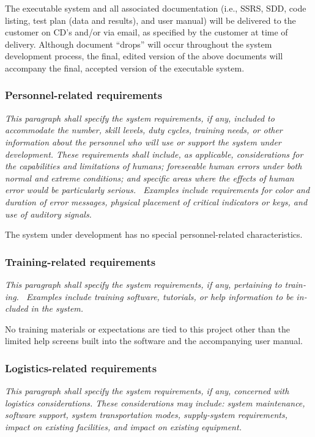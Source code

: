 \documentclass[twoside,letterpaper]{article}
\begin{document}
The executable system and all associated documentation (i.e., SSRS,
SDD, code listing, test plan (data and results), and user manual) will
be delivered to the customer on CD's and/or via email, as specified by
the customer at time of delivery. Although document ``drops'' will
occur throughout the system development process, the final, edited
version of the above documents will accompany the final, accepted
version of the executable system.

\subsubsection[Personnel{}-related requirements]{\rmfamily\bfseries
Personnel-related requirements}
\hypertarget{RefHeading19459017292}{}{
{\textit{This paragraph shall specify the system requirements,
if any, included to accommodate
the number, skill levels, duty cycles, training needs, or other information about the personnel who will use or support
the system under development. These requirements shall include, as applicable, considerations for the capabilities
and limitations of humans; foreseeable human errors under both normal and extreme conditions; and specific areas where
the effects of human error would be particularly serious. \ Examples include requirements for color and duration of
error messages, physical placement of critical indicators or keys, and use of auditory
signals.}}\foreignlanguage{english}{ }}

{\color{black}
The system under development has no special personnel-related characteristics. }

\subsubsection[Training{}-related requirements]{\rmfamily\bfseries\color{black} Training-related
requirements}
\hypertarget{RefHeading19659017292}{}{\color{black}
\foreignlanguage{english}{\textit{This paragraph shall specify the system requirements, if any, pertaining to training.
\ Examples include training software, tutorials, or help information to be included in the
system.}}\foreignlanguage{english}{ \ \ }}

{\color{black}
No training materials or expectations are tied to this project other than the limited help screens built into the
software and the accompanying user manual.}

\subsubsection[Logistics{}-related requirements]{\rmfamily\bfseries\color{black}
Logistics-related requirements}
\hypertarget{RefHeading19859017292}{}{\itshape\color{black}
This paragraph shall specify the system requirements, if any, concerned with logistics considerations. These
considerations may include: system maintenance, software support, system transportation modes, supply-system
requirements, impact on existing facilities, and impact on existing
equipment.
}
\end{document}
